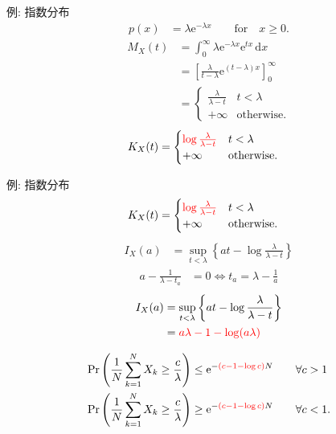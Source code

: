 \documentclass[lualatex,handout]{beamer}
\newcommand{\emm}[1]{\textcolor{red}{#1}}
\newcommand\dx{{\,\mathrm{d}x}}
\theoremstyle{definition}
\begin{document}
\begin{frame}{例: 指数分布}
\begin{align*}
p(x) &= \lambda\mathrm{e}^{-\lambda x}\qquad\text{for}\quad x\ge 0.
\end{align*}
\begin{align*}
M_X(t) &= \int_{0}^\infty \lambda\mathrm{e}^{-\lambda x} \mathrm{e}^{tx}\dx\\
&=\left[\frac{\lambda}{t-\lambda}\mathrm{e}^{(t-\lambda)x}\right]_0^{\infty}\\
&=\begin{cases}
\frac{\lambda}{\lambda-t}& t < \lambda\\
+\infty&\text{otherwise.}
\end{cases}
\end{align*}
\begin{align*}
K_X(t) &=
\begin{cases}
\emm{\log\frac{\lambda}{\lambda-t}}& t < \lambda\\
+\infty&\text{otherwise.}
\end{cases}
\end{align*}
\end{frame}

\begin{frame}{例: 指数分布}
\small
\begin{align*}
K_X(t) &=
\begin{cases}
\emm{\log\frac{\lambda}{\lambda-t}}& t < \lambda\\
+\infty&\text{otherwise.}
\end{cases}
\end{align*}
\begin{align*}
I_X(a) &= \sup_{t<\lambda} \left\{at - \log\frac{\lambda}{\lambda-t}\right\}
\end{align*}
\begin{align*}
a - \frac1{\lambda-t_a} &=0 \iff  t_a = \lambda-\frac1a
\end{align*}
\begin{align*}
I_X(a) &= \sup_{t<\lambda} \left\{at - \log\frac{\lambda}{\lambda-t}\right\}\\
&=
\emm{a\lambda - 1 - \log(a\lambda)}
\end{align*}

\begin{align*}
\Pr\left(\frac1N\sum_{k=1}^N X_k \ge \frac{c}{\lambda}\right) &\le \mathrm{e}^{-\emm{(c-1-\log c)}N} \qquad\forall c>1\\
\Pr\left(\frac1N\sum_{k=1}^N X_k \ge \frac{c}{\lambda}\right) &\ge \mathrm{e}^{-\emm{(c-1-\log c)}N} \qquad\forall c<1.
\end{align*}
\end{frame}
\end{document}
